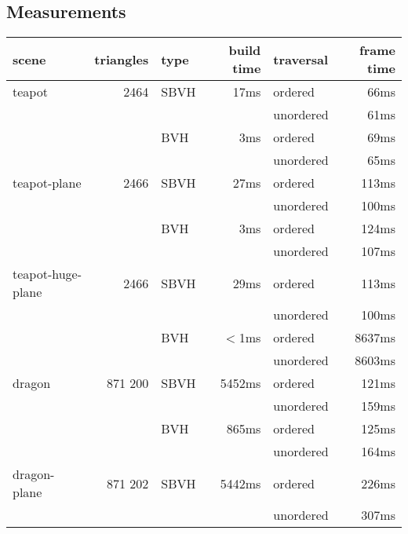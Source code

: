 \subsection{Measurements}
\begin{tabular}{lrlrlr}
    \toprule
    \textbf{scene} & \textbf{triangles} & \textbf{type} & \textbf{build time} & \textbf{traversal} & \textbf{frame time} \\
    \midrule
    teapot         &      2464 & SBVH &     17ms & ordered   &    66ms \\
                   &           &      &          & unordered &    61ms \\
                   &           & BVH  &      3ms & ordered   &    69ms \\
                   &           &      &          & unordered &    65ms \\
    \midrule                                     
    teapot-plane   &      2466 & SBVH &     27ms & ordered   &   113ms \\
                   &           &      &          & unordered &   100ms \\
                   &           & BVH  &      3ms & ordered   &   124ms \\
                   &           &      &          & unordered &   107ms \\
    \midrule                                     
    teapot-huge-plane &   2466 & SBVH &     29ms & ordered   &   113ms \\
                   &           &      &          & unordered &   100ms \\
                   &           & BVH  &   $<$1ms & ordered   &  8637ms \\
                   &           &      &          & unordered &  8603ms \\
    \midrule                                     
    dragon         &   871 200 & SBVH &   5452ms & ordered   &   121ms \\
                   &           &      &          & unordered &   159ms \\
                   &           & BVH  &    865ms & ordered   &   125ms \\
                   &           &      &          & unordered &   164ms \\
    \midrule                                     
    dragon-plane   &   871 202 & SBVH &   5442ms & ordered   &   226ms \\
                   &           &      &          & unordered &   307ms \\

\end{tabular}
